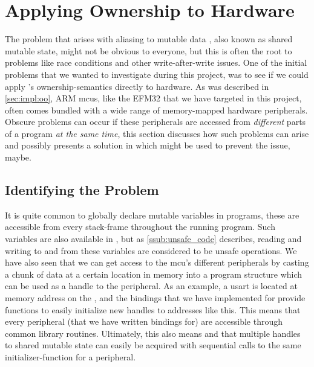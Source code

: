 
\section{Applying Ownership to Hardware}
\label{sec:ownership_allied_to_hardware}

The problem that arises with aliasing to mutable data \cite{web:problem_with_shared_mutability}, also known as shared mutable state, might not be obvious to everyone, but this is often the root to problems like race conditions and other write-after-write issues.
One of the initial problems that we wanted to investigate during this project, was to see if we could apply {\rust}'s ownership-semantics directly to hardware.
As was described in \autoref{sec:impl:oo}, ARM \glspl{mcu}, like the EFM32 that we have targeted in this project, often comes bundled with a wide range of memory-mapped hardware peripherals.
Obscure problems can occur if these peripherals are accessed from \emph{different} parts of a program \emph{at the same time}, this section discusses how such problems can arise and possibly presents a solution in which {\rust} might be used to prevent the issue, maybe.

\subsection{Identifying the Problem}

It is quite common to globally declare mutable variables in {\C} programs, these are accessible from every stack-frame throughout the running program.
Such variables are also available in {\rust}, but as \autoref{ssub:unsafe_code} describes, reading and writing to and from these variables are considered to be unsafe operations.
We have also seen that we can get access to the \gls{mcu}'s different peripherals by casting a chunk of data at a certain location in memory into a program structure which can be used as a handle to the peripheral.
As an example, a \gls{usart} is located at memory address  on the {\gecko}, and the bindings that we have implemented for {\emlib} provide functions to easily initialize new handles to addresses like this.
This means that every peripheral (that we have written bindings for) are accessible through common library routines.
Ultimately, this also means and that multiple handles to shared mutable state can easily be acquired with sequential calls to the same initializer-function for a peripheral.

